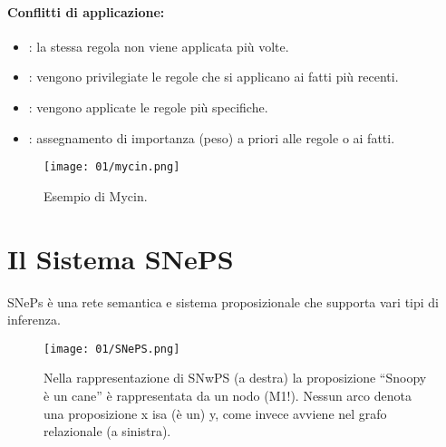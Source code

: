 \paragraph{Conflitti di applicazione:}

\begin{itemize}
\item {}: la stessa regola non viene applicata più volte.
\item {}: vengono privilegiate le regole che si applicano ai fatti
più recenti. 
\item {}: vengono applicate le regole più specifiche.
\item {}: assegnamento di importanza (peso) a priori alle regole
o ai fatti.
\end{itemize}



\begin{figure}[h]
    \centering
    \texttt{[image: 01/mycin.png]}
    \caption{Esempio di Mycin.}
\end{figure}

\section{Il Sistema SNePS}

SNePs è una rete semantica e sistema proposizionale che supporta vari tipi di inferenza. 

\begin{figure}[h]
    \centering
    \texttt{[image: 01/SNePS.png]}
    \caption{Nella rappresentazione di SNwPS (a destra) la proposizione “Snoopy
è un cane” è rappresentata da un nodo (M1!).
Nessun arco denota una proposizione x isa (è un) y, come invece
avviene nel grafo relazionale (a sinistra).}
\end{figure}


